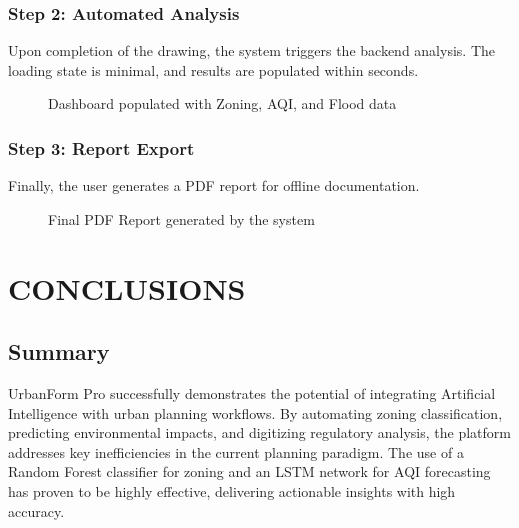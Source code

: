 \documentclass[12pt,a4paper]{report}
\begin{document}
\subsection{Step 2: Automated Analysis}
Upon completion of the drawing, the system triggers the backend analysis. The loading state is minimal, and results are populated within seconds.
\begin{figure}[H]
  \centering
  \caption{Dashboard populated with Zoning, AQI, and Flood data}
\end{figure}

\subsection{Step 3: Report Export}
Finally, the user generates a PDF report for offline documentation.
\begin{figure}[H]
  \centering
  \caption{Final PDF Report generated by the system}
\end{figure}

\chapter{CONCLUSIONS}

\section{Summary}
UrbanForm Pro successfully demonstrates the potential of integrating Artificial Intelligence with urban planning workflows. By automating zoning classification, predicting environmental impacts, and digitizing regulatory analysis, the platform addresses key inefficiencies in the current planning paradigm. The use of a Random Forest classifier for zoning and an LSTM network for AQI forecasting has proven to be highly effective, delivering actionable insights with high accuracy.
\end{document}
